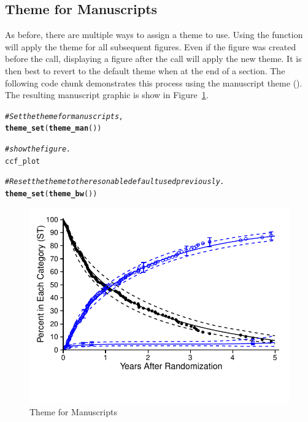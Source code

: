 \documentclass[nojss]{jss}\usepackage[]{graphicx}\usepackage[]{color}
\makeatletter
\def\maxwidth{ %
  \ifdim\Gin@nat@width>\linewidth
    \linewidth
  \else
    \Gin@nat@width
  \fi
}
\newcommand{\hlcom}[1]{\textcolor[rgb]{0.678,0.584,0.686}{\textit{#1}}}%
\newcommand{\hlstd}[1]{\textcolor[rgb]{0.345,0.345,0.345}{#1}}%
\newcommand{\hlkwd}[1]{\textcolor[rgb]{0.737,0.353,0.396}{\textbf{#1}}}%
\newenvironment{kframe}{%
 \def\at@end@of@kframe{}%
 \ifinner\ifhmode%
  \def\at@end@of@kframe{\end{minipage}}%
  \begin{minipage}{\columnwidth}%
 \fi\fi%
 \def\FrameCommand##1{\hskip\@totalleftmargin \hskip-\fboxsep
 \colorbox{shadecolor}{##1}\hskip-\fboxsep
     \hskip-\linewidth \hskip-\@totalleftmargin \hskip\columnwidth}%
 \MakeFramed {\advance\hsize-\width
   \@totalleftmargin\z@ \linewidth\hsize
   \@setminipage}}%
 {\par\unskip\endMakeFramed%
 \at@end@of@kframe}
\newenvironment{knitrout}{}{} %
\makeatother
\begin{document}
\subsection{Theme for Manuscripts}\label{S:theme_man}

As before, there are multiple ways to assign a theme to use. Using the  function will apply the theme for all subsequent figures. Even if the figure was created before the  call, displaying a figure after the call will apply the new theme. It is then best to revert to the default theme when at the end of a section. The following code chunk demonstrates this process using the manuscript theme (). The resulting manuscript graphic is show in Figure~\ref{F:manuscriptTheme}.
\begin{knitrout}\footnotesize
{}\color{fgcolor}\begin{kframe}
\begin{alltt}
\hlcom{# Set the theme for manuscripts,}
\hlkwd{theme_set}\hlstd{(}\hlkwd{theme_man}\hlstd{())}

\hlcom{# show the figure.}
\hlstd{ccf_plot}

\hlcom{# Reset the theme to the resonable default used previously.}
\hlkwd{theme_set}\hlstd{(}\hlkwd{theme_bw}\hlstd{())}
\end{alltt}
\end{kframe}\begin{figure}[htpb]


{\centering \includegraphics[width=\maxwidth]{figure/beamer-manuscriptTheme} 

}

\caption[Theme for Manuscripts]{Theme for Manuscripts\label{F:manuscriptTheme}}
\end{figure}


\end{knitrout}
\end{document}
